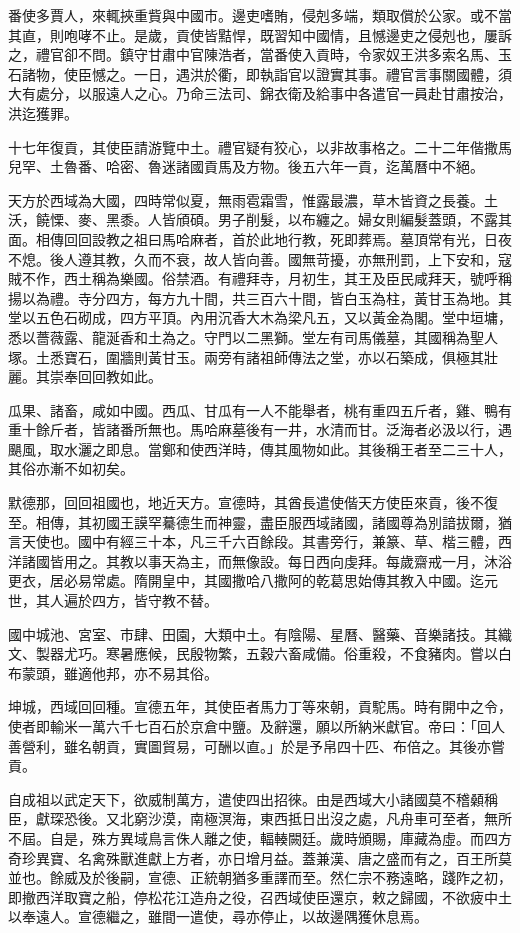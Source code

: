 \begin{pinyinscope}
番使多賈人，來輒挾重貲與中國市。邊吏嗜賄，侵剋多端，類取償於公家。或不當其直，則咆哮不止。是歲，貢使皆黠悍，既習知中國情，且憾邊吏之侵剋也，屢訴之，禮官卻不問。鎮守甘肅中官陳浩者，當番使入貢時，令家奴王洪多索名馬、玉石諸物，使臣憾之。一日，遇洪於衢，即執詣官以證實其事。禮官言事關國體，須大有處分，以服遠人之心。乃命三法司、錦衣衛及給事中各遣官一員赴甘肅按治，洪迄獲罪。

十七年復貢，其使臣請游覽中土。禮官疑有狡心，以非故事格之。二十二年偕撒馬兒罕、土魯番、哈密、魯迷諸國貢馬及方物。後五六年一貢，迄萬曆中不絕。

天方於西域為大國，四時常似夏，無雨雹霜雪，惟露最濃，草木皆資之長養。土沃，饒慄、麥、黑黍。人皆頎碩。男子削髮，以布纏之。婦女則編髮蓋頭，不露其面。相傳回回設教之祖曰馬哈麻者，首於此地行教，死即葬焉。墓頂常有光，日夜不熄。後人遵其教，久而不衰，故人皆向善。國無苛擾，亦無刑罰，上下安和，寇賊不作，西土稱為樂國。俗禁酒。有禮拜寺，月初生，其王及臣民咸拜天，號呼稱揚以為禮。寺分四方，每方九十間，共三百六十間，皆白玉為柱，黃甘玉為地。其堂以五色石砌成，四方平頂。內用沉香大木為梁凡五，又以黃金為閣。堂中垣墉，悉以薔薇露、龍涎香和土為之。守門以二黑獅。堂左有司馬儀墓，其國稱為聖人塚。土悉寶石，圍牆則黃甘玉。兩旁有諸祖師傳法之堂，亦以石築成，俱極其壯麗。其崇奉回回教如此。

瓜果、諸畜，咸如中國。西瓜、甘瓜有一人不能舉者，桃有重四五斤者，雞、鴨有重十餘斤者，皆諸番所無也。馬哈麻墓後有一井，水清而甘。泛海者必汲以行，遇颶風，取水灑之即息。當鄭和使西洋時，傳其風物如此。其後稱王者至二三十人，其俗亦漸不如初矣。

默德那，回回祖國也，地近天方。宣德時，其酋長遣使偕天方使臣來貢，後不復至。相傳，其初國王謨罕驀德生而神靈，盡臣服西域諸國，諸國尊為別諳拔爾，猶言天使也。國中有經三十本，凡三千六百餘段。其書旁行，兼篆、草、楷三體，西洋諸國皆用之。其教以事天為主，而無像設。每日西向虔拜。每歲齋戒一月，沐浴更衣，居必易常處。隋開皇中，其國撒哈八撒阿的乾葛思始傳其教入中國。迄元世，其人遍於四方，皆守教不替。

國中城池、宮室、市肆、田園，大類中土。有陰陽、星曆、醫藥、音樂諸技。其織文、製器尤巧。寒暑應候，民殷物繁，五穀六畜咸備。俗重殺，不食豬肉。嘗以白布蒙頭，雖適他邦，亦不易其俗。

坤城，西域回回種。宣德五年，其使臣者馬力丁等來朝，貢駝馬。時有開中之令，使者即輸米一萬六千七百石於京倉中鹽。及辭還，願以所納米獻官。帝曰：「回人善營利，雖名朝貢，實圖貿易，可酬以直。」於是予帛四十匹、布倍之。其後亦嘗貢。

自成祖以武定天下，欲威制萬方，遣使四出招徠。由是西域大小諸國莫不稽顙稱臣，獻琛恐後。又北窮沙漠，南極溟海，東西抵日出沒之處，凡舟車可至者，無所不屆。自是，殊方異域鳥言侏人離之使，輻輳闕廷。歲時頒賜，庫藏為虛。而四方奇珍異寶、名禽殊獸進獻上方者，亦日增月益。蓋兼漢、唐之盛而有之，百王所莫並也。餘威及於後嗣，宣德、正統朝猶多重譯而至。然仁宗不務遠略，踐阼之初，即撤西洋取寶之船，停松花江造舟之役，召西域使臣還京，敕之歸國，不欲疲中土以奉遠人。宣德繼之，雖間一遣使，尋亦停止，以故邊隅獲休息焉。


\end{pinyinscope}
